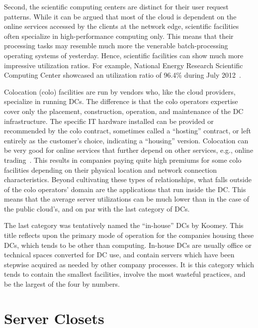 \documentclass[officiallayout]{tktla}
\begin{document}
Second, the scientific computing centers are distinct for their user request
patterns. While it can be argued that most of the cloud is dependent on the
online services accessed by the clients at the network edge, scientific
facilities often specialize in high-performance computing only. This means
that their processing tasks may resemble much more the venerable
batch-processing operating systems of yesterday. Hence, scientific facilities
can show much more impressive utilization ratios. For example, National Energy
Research Scientific Computing Center showcased an utilization ratio of 96.4\%
during July 2012~\cite{Glantz2012}.

Colocation (colo) facilities are run by vendors who, like the cloud providers,
specialize in running DCs. The difference is that the colo operators expertise
cover only the placement, construction, operation, and maintenance of the DC
infrastructure. The specific IT hardware installed can be provided or
recommended by the colo contract, sometimes called a ``hosting'' contract, or
left entirely as the customer's choice, indicating a ``housing'' version.
Colocation can be very good for online services that further depend on other
services, e.g., online trading~\cite{Glantz2013}. This results in companies
paying quite high premiums for some colo facilities depending on their
physical location and network connection characteristics. Beyond cultivating
these types of relationships, what falls outside of the colo operators' domain
are the applications that run inside the DC. This means that the average
server utilizations can be much lower than in the case of the public cloud's,
and on par with the last category of DCs.

The last category was tentatively named the ``in-house'' DCs by Koomey. This
title reflects upon the primary mode of operation for the companies housing
these DCs, which tends to be other than computing. In-house DCs are usually
office or technical spaces converted for DC use, and contain servers which
have been stepwise acquired as needed by other company processes. It is this
category which tends to contain the smallest facilities, involve the most
wasteful practices, and be the largest of the four by numbers.


\section{Server Closets}
\label{sec:closets}
\end{document}
